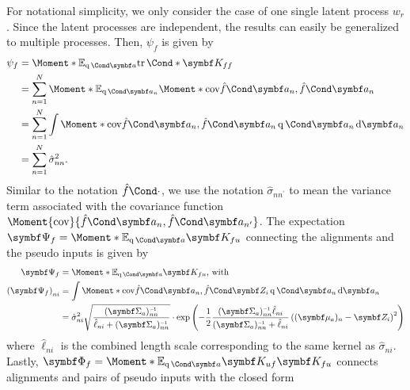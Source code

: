 For notational simplicity, we only consider the case of one single latent process $w_r$.
Since the latent processes are independent, the results can easily be generalized to multiple processes.
Then, $\psi_f$ is given by
\begin{align}
\begin{split}
    \psi_f &= \Moment*{\E_{\Variat{\rv{a}}}}{\Fun*{\tr}{\mat{K_{ff}}}} \\
    &= \sum_{n=1}^N \Moment*{\E_{\Variat{\rv{a_n}}}}{\Moment*{\cov}{\Fun{\hat{f}}{\mat{a_n}}, \Fun{\hat{f}}{\mat{a_n}}}} \\
    &= \sum_{n=1}^N \int \Moment*{\cov}{\Fun{\hat{f}}{\mat{a_n}}, \Fun{\hat{f}}{\mat{a_n}}} \Variat{\rv{a_n}} \diff \rv{a_n} \\
    &= \sum_{n=1}^N \hat{\sigma}_{nn}^2.
\end{split}
\end{align}
Similar to the notation $\Fun{\hat{f}}{\cdot}$, we use the notation $\hat{\sigma}_{nn^\prime}$ to mean the variance term associated with the covariance function $\Moment{\cov}{\Fun{\hat{f}}{\mat{a_n}}, \Fun{\hat{f}}{\mat{a_{n^\prime}}}}$.
The expectation $\mat{\Psi_f} = \Moment*{\E_{\Variat{\rv{a}}}}{\mat{K_{fu}}}$ connecting the alignments and the pseudo inputs is given by
\begin{align}
\begin{split}
    \mat{\Psi_f} &= \Moment*{\E_{\Variat{\rv{a}}}}{\mat{K_{fu}}}\text{, with} \\
    \left( \mat{\Psi_f} \right)_{ni}
    &= \int \Moment*{\cov}{\Fun{\hat{f}}{\mat{a_n}}, \Fun{\hat{f}}{\mat{Z_i}}} \Variat{\rv{a_n}} \diff \rv{a_n} \\
    &= \hat{\sigma}_{ni}^2 \sqrt{\frac{(\mat{\Sigma_a})_{nn}\inv}{\hat{\ell}_{ni} + (\mat{\Sigma_a})_{nn}\inv}}
    \cdot \exp\left(-\frac{1}{2} \frac{(\mat{\Sigma_a})_{nn}\inv\hat{\ell}_{ni}}{(\mat{\Sigma_a})_{nn}\inv + \hat{\ell}_{ni}} \left((\mat{\mu_a})_n - \mat{Z_i}\right)^2\right)
\end{split}
\end{align}
where $\hat{\ell}_{ni}$ is the combined length scale corresponding to the same kernel as $\hat{\sigma}_{ni}$.
Lastly, $\mat{\Phi_f} = \Moment*{\E_{\Variat{\rv{a}}}}{\mat{K_{uf}}\mat{K_{fu}}}$ connects alignments and pairs of pseudo inputs with the closed form
